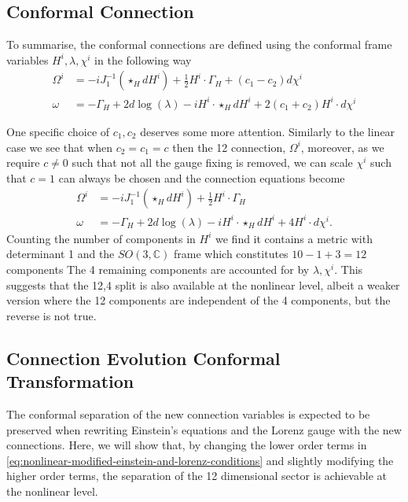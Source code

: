 \documentclass[10pt]{report}
\theoremstyle{definition}
\newcommand{\C}[0]{\mathbb{C}}
\begin{document}
        \subsection{Conformal Connection}
        To summarise, the conformal connections are defined using the conformal frame variables $H^i,\lambda,\chi^i$ in the following way 
        \begin{align}
            \Omega^i & = -i J_1^{-1}(\star_H dH^i) + \frac{1}{2} H^i \cdot \Gamma_H + (c_1 - c_2) d\chi^i \\
            \omega & = -\Gamma_H + 2 d\log(\lambda) - i H^i \cdot \star_H dH^i + 2(c_1 + c_2) H^i \cdot d\chi^i
        \end{align}

        One specific choice of $c_1,c_2$ deserves some more attention. Similarly to the linear case we see that when $c_2 = c_1 = c$ then the 12 connection, $\Omega^i$, moreover, as we require $c \neq 0$ such that not all the gauge fixing is removed, we can scale $\chi^i$ such that $c = 1$ can always be chosen and the connection equations become
        \begin{align}
            \Omega^i & = -i J_1^{-1}(\star_H dH^i) + \frac{1}{2} H^i \cdot \Gamma_H \\
            \omega & = -\Gamma_H + 2 d\log(\lambda) - i H^i \cdot \star_H dH^i + 4 H^i \cdot d\chi^i.
        \end{align}
        Counting the number of components in $H^i$ we find it contains a metric with determinant 1 and the $SO(3,\C)$ frame which constitutes $10-1+3=12$ components The 4 remaining components are accounted for by $\lambda, \chi^i$. This suggests that the 12,4 split is also available at the nonlinear level, albeit a weaker version where the 12 components are independent of the 4 components, but the reverse is not true.
        
        \subsection{Connection Evolution Conformal Transformation}
        The conformal separation of the new connection variables is expected to be preserved when rewriting Einstein's equations and the Lorenz gauge with the new connections.  Here, we will show that, by changing the lower order terms in \cref{eq:nonlinear-modified-einstein-and-lorenz-conditions} and slightly modifying the higher order terms, the separation of the 12 dimensional sector is achievable at the nonlinear level.
\end{document}
